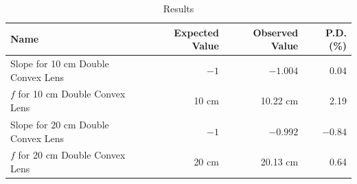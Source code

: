 \begin{table}[ht]
    \centering
    \begin{tabular}{|l|r|r|r|}
        \hline
        Name & Expected Value & Observed Value & P.D. (\%) \\
        \hline
        Slope for 10 cm Double Convex Lens & $-1$ & $-1.004$ & 0.04 \\
        $f$ for 10 cm Double Convex Lens & 10 cm & 10.22 cm & 2.19 \\
        Slope for 20 cm Double Convex Lens & $-1$ & $-0.992$ & $-0.84$ \\
        $f$ for 20 cm Double Convex Lens & 20 cm & 20.13 cm & 0.64 \\
        \hline
    \end{tabular}
    \caption{Results}
    \label{table.08.results}
\end{table}
\FloatBarrier
\newpage
